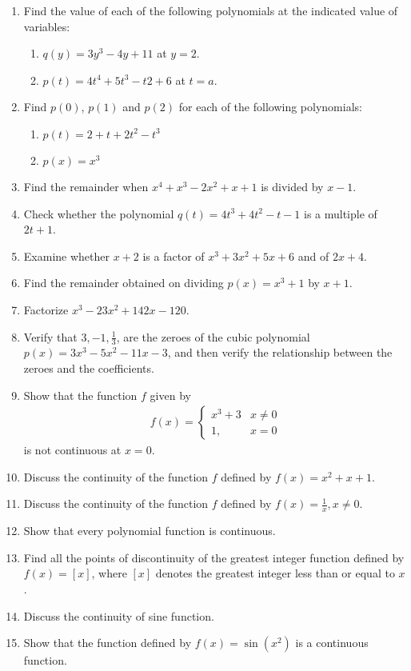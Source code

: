 \renewcommand{\theequation}{\theenumi}
\begin{enumerate}[label=\arabic*.,ref=\thesubsection.\theenumi]
%
\item Find the value of each of the following polynomials at the indicated value of variables: 
\begin{enumerate}
\item  $q(y) = 3y^3 - 4y + 11$ at $y = 2. $
\item  $p(t) = 4t^4+ 5t^3 - t2 + 6$ at $t = a.$
\end{enumerate}
%
\item Find $p(0)$, $p(1)$ and $p(2)$ for each of the following polynomials: 
\begin{enumerate}
\item  $p(t) = 2 + t + 2t^2 - t^3 $
\item $ p(x) = x^3$
\end{enumerate}
%
\item Find the remainder when $x^4+x^3-2x^2+x+1$ is divided by $x-1$.
%
\item Check whether the polynomial $q(t) = 4t^3+4t^2-t-1$ is a multiple of $2t+1$.
\item Examine whether $x + 2$ is a factor of $x^3 + 3x^2 + 5x + 6$ and of $2x + 4$.
\item Find the remainder obtained on dividing $p(x) = x^3+1 $ by $x+1$.
\item Factorize $x^3 - 23x^2 + 142x -120$.
\item Verify that $3, -1, \frac{1}{ 3}$, are the zeroes of the cubic polynomial $p(x) = 3x^3 - 5x^2 - 11x - 3$, and then verify the relationship between the zeroes and the coefficients.
%
\item Show that the function $f$ given by 
\begin{align}
f(x) = 
\begin{cases}
x^3+3 & x \ne 0
\\
1, & x = 0
\end{cases}
\end{align}
%
is not continuous at $x = 0$.
\item Discuss the continuity of the function $f$ defined by $f(x) = x^2+x+1$.
\item Discuss the continuity of the function $f$ defined by $f(x) = \frac{1}{x}, x \ne 0$.
%
\item Show that every polynomial function is continuous.
%
\item Find all the points of discontinuity of the greatest integer function defined by $f(x) = [x]$, where $[x]$ denotes the greatest integer less than or equal to $x$.
%
\item Discuss the continuity of sine function.
\item Show that the function defined by $f(x) = \sin (x^2 )$ is a continuous function.


\end{enumerate}
